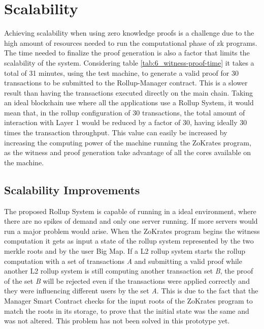\section{Scalability}

Achieving scalability when using zero knowledge proofs is a challenge due to the high amount of resources needed to run the computational phase of zk programs. The time needed to finalize the proof generation is also a factor that limits the scalability of the system. Considering table \ref{tab:6_witness-proof-time} it takes a total of 31 minutes, using the test machine, to generate a valid proof for 30 transactions to be submitted to the Rollup-Manager contract. This is a slower result than having the transactions executed directly on the main chain. Taking an ideal blockchain use where all the applications use a Rollup System, it would mean that, in the rollup configuration of 30 transactions, the total amount of interaction with Layer 1 would be reduced by a factor of 30, having ideally 30 times the transaction throughput. This value can easily be increased by increasing the computing power of the machine running the ZoKrates program, as the witness and proof generation take advantage of all the cores available on the machine.

\subsection{Scalability Improvements}

The proposed Rollup System is capable of running in a ideal environment, where there are no spikes of demand and only one server running. If more servers would run a major problem would arise. When the ZoKrates program begins the witness computation it gets as input a state of the rollup system represented by the two merkle roots and by the user Big Map. If a L2 rollup system starts the rollup computation with a set of transactions \textit{A} and submitting a valid proof while another L2 rollup system is still computing another transaction set \textit{B}, the proof of the set \textit{B} will be rejected even if the transactions were applied correctly and they were influencing different users by the set \textit{A}. This is due to the fact that the Manager Smart Contract checks for the input roots of the ZoKrates program to match the roots in its storage, to prove that the initial state was the same and was not altered. This problem has not been solved in this prototype yet.

